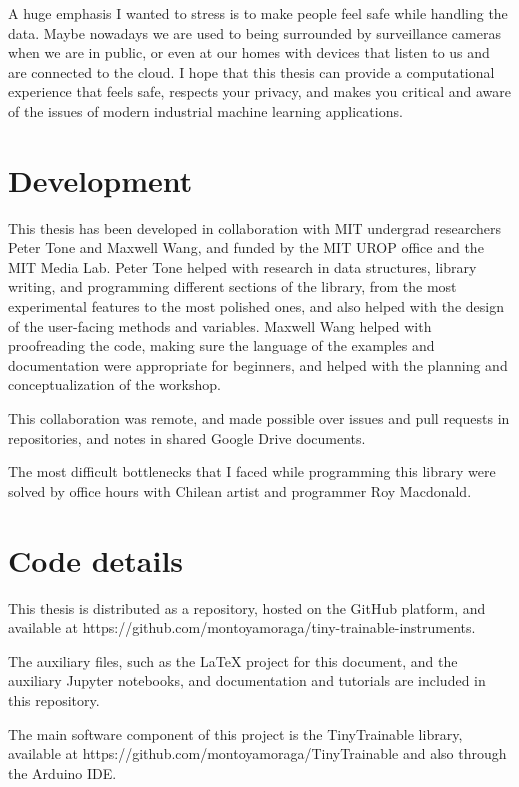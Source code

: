 A huge emphasis I wanted to stress is to make people feel safe while handling the data. Maybe nowadays we are used to being surrounded by surveillance cameras when we are in public, or even at our homes with devices that listen to us and are connected to the cloud. I hope that this thesis can provide a computational experience that feels safe, respects your privacy, and makes you critical and aware of the issues of modern industrial machine learning applications.

\section{Development}

This thesis has been developed in collaboration with MIT undergrad researchers Peter Tone and Maxwell Wang, and funded by the MIT UROP office and the MIT Media Lab. Peter Tone helped with research in data structures, library writing, and programming different sections of the library, from the most experimental features to the most polished ones, and also helped with the design of the user-facing methods and variables. Maxwell Wang helped with proofreading the code, making sure the language of the examples and documentation were appropriate for beginners, and helped with the planning and conceptualization of the workshop. 

This collaboration was remote, and made possible over issues and pull requests in repositories, and notes in shared Google Drive documents.

The most difficult bottlenecks that I faced while programming this library were solved by office hours with Chilean artist and programmer Roy Macdonald.

\section{Code details}

This thesis is distributed as a repository, hosted on the GitHub platform, and available at https://github.com/montoyamoraga/tiny-trainable-instruments.

The auxiliary files, such as the LaTeX project for this document, and the auxiliary Jupyter notebooks, and documentation and tutorials are included in this repository.

The main software component of this project is the TinyTrainable library, available at https://github.com/montoyamoraga/TinyTrainable and also through the Arduino IDE.


